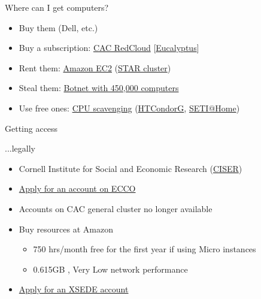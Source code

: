 \documentclass[xcolor=table,compress]{beamer}
\begin{document}
\begin{frame}{Where can I get computers?}
\begin{itemize}
\item Buy them (Dell, etc.)
\item Buy a subscription: \href{http://www.cac.cornell.edu/RedCloud/}{CAC RedCloud} [\href{http://www.eucalyptus.com/}{Eucalyptus}]
\item Rent them: \href{http://docs.aws.amazon.com/AWSEC2/latest/UserGuide/using-spot-instances-cluster.html}{Amazon EC2} (\href{http://star.mit.edu/cluster/docs/latest/quickstart.html}{STAR cluster})
\item Steal them: \href{http://en.wikipedia.org/wiki/Srizbi_botnet}{Botnet with 450,000 computers}
\item Use free ones: \href{http://en.wikipedia.org/wiki/CPU_scavenging}{CPU scavenging} \newline(\href{http://en.wikipedia.org/wiki/HTCondor}{HTCondorG}, \href{http://setiathome.berkeley.edu/}{SETI@Home})
\end{itemize}
\end{frame}

\begin{frame}{Getting access}
\begin{block}{...legally}
\begin{itemize}
\item Cornell Institute for Social and Economic Research 
(\href{http://www.ciser.cornell.edu}{CISER})
\item 
\href{http://www2.vrdc.cornell.edu/news/ecco/step-1-requesting-an-ecco-account/}{Apply for 
an account on ECCO}
\item Accounts on CAC general cluster no longer available
\item Buy resources at Amazon 
\begin{itemize}
\item 750 hrs/month free for the first year if using Micro instances
\item 0.615GB	, Very Low network performance
\end{itemize}
\item \href{https://www.xsede.org/using-xsede\#step3}{Apply for an XSEDE account}
\end{itemize}
\end{block}
\end{frame}
\end{document}

